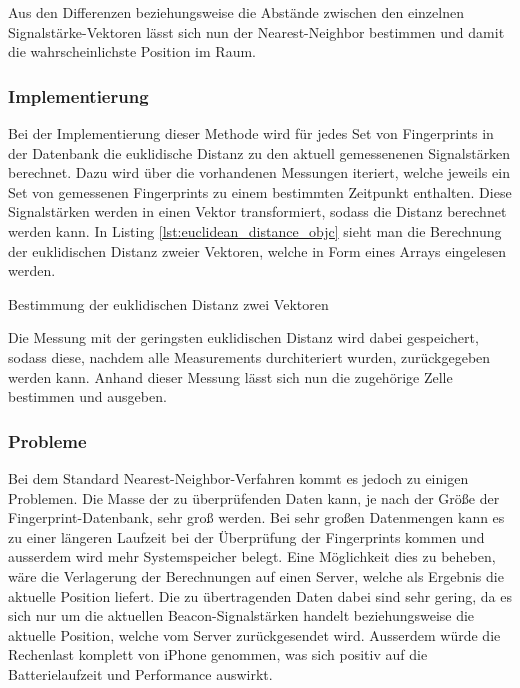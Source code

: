 Aus den Differenzen beziehungsweise die Abstände zwischen den einzelnen Signalstärke-Vektoren lässt sich nun der Nearest-Neighbor bestimmen und damit die wahrscheinlichste Position im Raum.


\subsubsection{Implementierung}
\label{sec:implementation:fingerprinting:positioning:naiv:implementation}
Bei der Implementierung dieser Methode wird für jedes Set von Fingerprints in der Datenbank die euklidische Distanz zu den aktuell gemessenenen Signalstärken berechnet. Dazu wird über die vorhandenen Messungen iteriert, welche jeweils ein Set von gemessenen Fingerprints zu einem bestimmten Zeitpunkt enthalten. Diese Signalstärken werden in einen Vektor transformiert, sodass die Distanz berechnet werden kann. In Listing \ref{lst:euclidean_distance_objc} sieht man die Berechnung der euklidischen Distanz zweier Vektoren, welche in Form eines Arrays eingelesen werden.

\begin{listing}[htb!]
    \caption{Bestimmung der euklidischen Distanz zwei Vektoren}
	\label{lst:euclidean_distance_objc}
\end{listing}

Die Messung mit der geringsten euklidischen Distanz wird dabei gespeichert, sodass diese, nachdem alle Measurements durchiteriert wurden, zurückgegeben werden kann. Anhand dieser Messung lässt sich nun die zugehörige Zelle bestimmen und ausgeben.

\subsubsection{Probleme}
\label{sec:implementation:fingerprinting:positioning:naiv:problems}
Bei dem Standard Nearest-Neighbor-Verfahren kommt es jedoch zu einigen Problemen. 
Die Masse der zu überprüfenden Daten kann, je nach der Größe der Fingerprint-Datenbank, sehr groß werden. Bei sehr großen Datenmengen kann es zu einer längeren Laufzeit bei der Überprüfung der Fingerprints kommen und ausserdem wird mehr Systemspeicher belegt. 
Eine Möglichkeit dies zu beheben, wäre die Verlagerung der Berechnungen auf einen Server, welche als Ergebnis die aktuelle Position liefert. Die zu übertragenden Daten dabei sind sehr gering, da es sich nur um die aktuellen Beacon-Signalstärken handelt beziehungsweise die aktuelle Position, welche vom Server zurückgesendet wird. 
Ausserdem würde die Rechenlast komplett von iPhone genommen, was sich positiv auf die Batterielaufzeit und Performance auswirkt.

